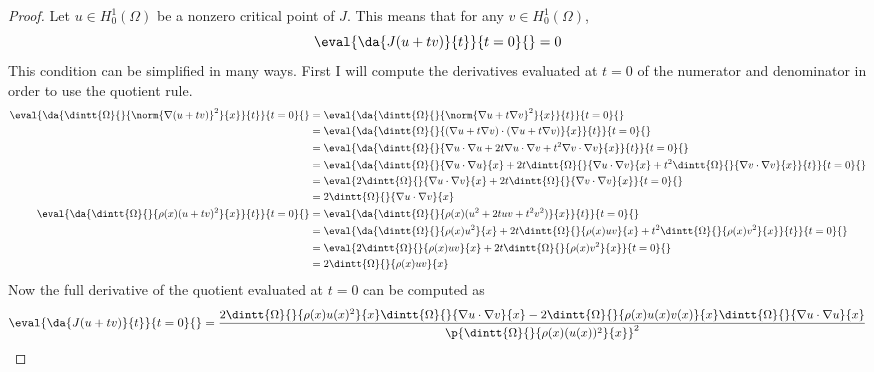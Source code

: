 \documentclass[11pt, oneside]{article}
\begin{document}
\begin{enumerate}
\begin{enumerate}
        \begin{proof}
          Let $u \in H^1_0(\Omega)$ be a nonzero critical point of $J$.
          This means that for any $v \in H^1_0(\Omega)$,
          \[
            \eval{\da{J(u + tv)}{t}}{t = 0}{} = 0
          \]
          This condition can be simplified in many ways.
          First I will compute the derivatives evaluated at $t = 0$ of the
          numerator and denominator in order to use the quotient rule.
          \begin{align*}
            \eval{\da{\dintt{\Omega}{}{\norm{\nabla (u + tv)}^2}{x}}{t}}{t=0}{} &= \eval{\da{\dintt{\Omega}{}{\norm{\nabla u + t \nabla v}^2}{x}}{t}}{t=0}{} \\
            &= \eval{\da{\dintt{\Omega}{}{(\nabla u + t \nabla v)\cdot (\nabla u + t \nabla v)}{x}}{t}}{t=0}{} \\
            &= \eval{\da{\dintt{\Omega}{}{\nabla u \cdot \nabla u + 2 t \nabla u \cdot \nabla v + t^2 \nabla v \cdot \nabla v}{x}}{t}}{t=0}{} \\
            &= \eval{\da{\dintt{\Omega}{}{\nabla u \cdot \nabla u}{x} + 2 t \dintt{\Omega}{}{\nabla u \cdot \nabla v}{x} + t^2 \dintt{\Omega}{}{\nabla v \cdot \nabla v}{x}}{t}}{t=0}{} \\
            &= \eval{2 \dintt{\Omega}{}{\nabla u \cdot \nabla v}{x} + 2 t \dintt{\Omega}{}{\nabla v \cdot \nabla v}{x}}{t=0}{} \\
            &= 2 \dintt{\Omega}{}{\nabla u \cdot \nabla v}{x} \\
            \eval{\da{\dintt{\Omega}{}{\rho(x) (u + tv)^2}{x}}{t}}{t=0}{} &= \eval{\da{\dintt{\Omega}{}{\rho(x) (u^2 + 2tuv + t^2v^2)}{x}}{t}}{t=0}{}\\
            &= \eval{\da{\dintt{\Omega}{}{\rho(x) u^2}{x} + 2t \dintt{\Omega}{}{\rho(x) uv}{x} + t^2 \dintt{\Omega}{}{\rho(x) v^2}{x}}{t}}{t=0}{}\\
            &= \eval{2\dintt{\Omega}{}{\rho(x) uv}{x} + 2t \dintt{\Omega}{}{\rho(x) v^2}{x}}{t=0}{} \\
            &= 2\dintt{\Omega}{}{\rho(x) uv}{x} \\
          \end{align*}
          Now the full derivative of the quotient evaluated at $t = 0$ can be
          computed as
          \[
            \eval{\da{J(u + tv)}{t}}{t=0}{} = \frac{2\dintt{\Omega}{}{\rho(x) u(x)^2}{x}\dintt{\Omega}{}{\nabla u \cdot \nabla v}{x} -  2\dintt{\Omega}{}{\rho(x) u(x)v(x)}{x}\dintt{\Omega}{}{\nabla u \cdot \nabla u}{x}}{\p{\dintt{\Omega}{}{\rho(x) (u(x))^2}{x}}^2}
\]
\end{proof}
\end{enumerate}
\end{enumerate}
\end{document}

